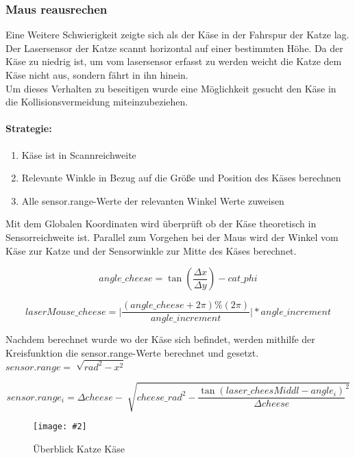 \documentclass[
a4paper,     %
12pt         %
]{scrartcl}  %
\newcommand{\mygraphics}[3]{
\begin{figure}[!h]
  \begin{center}
    \texttt{[image: \#2]} \\
    \caption{#3}\label{fig:#2}
  \end{center}
\end{figure}

}
\begin{document}
\subsubsection{Maus reausrechen}
Eine Weitere Schwierigkeit zeigte sich als der Käse in der Fahrspur der Katze lag. Der Lasersensor der Katze scannt horizontal auf einer bestimmten Höhe. Da der Käse zu niedrig ist, um vom lasersensor erfasst zu werden weicht die Katze dem Käse nicht aus, sondern fährt in ihn hinein. \\
Um dieses Verhalten zu beseitigen wurde eine Möglichkeit gesucht den Käse in die Kollisionsvermeidung miteinzubeziehen.

\paragraph{Strategie:}
\begin{enumerate}
\item Käse ist in Scannreichweite
\item Relevante Winkle in Bezug auf die Größe und Position des Käses berechnen
\item Alle sensor.range-Werte der relevanten Winkel Werte zuweisen
\end{enumerate}

Mit dem Globalen Koordinaten wird überprüft ob der Käse theoretisch in Sensorreichweite ist. Parallel zum Vorgehen bei der Maus wird der Winkel vom Käse zur Katze und der Sensorwinkle zur Mitte des Käses berechnet.

\[ angle\_cheese=\tan( \frac{\Delta x}{\Delta y} ) -cat\_phi \]

\[ laserMouse\_cheese  =  \vert \frac{ (angle\_cheese + 2  \pi) \% (2 \pi)}{angle\_increment}  \vert * angle\_increment \]

Nachdem berechnet wurde wo der Käse sich befindet, werden mithilfe der Kreisfunktion die sensor.range-Werte berechnet und gesetzt. $ sensor.range=\sqrt[]{ rad^2 -x^2 }$

\[ sensor.range_i = \Delta cheese - \sqrt[]{ cheese\_rad^2 -\frac{\tan( laser\_cheesMiddl - angle_i) }{\Delta cheese}^2 }\]
\hspace*{0.63\textwidth}
\mygraphics{0.5\textwidth}{catcheese.png}{Überblick Katze Käse}
\end{document}
